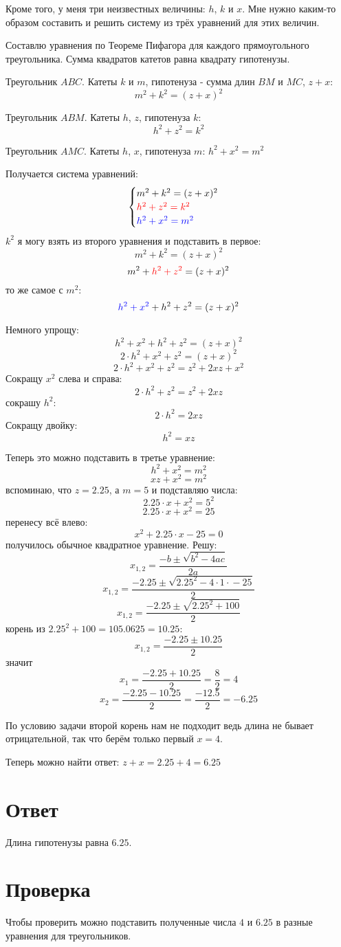 \documentclass{article}
\begin{document}
Кроме того, у меня три неизвестных величины:  $h$, $k$ и $x$. Мне нужно каким-то образом составить и решить систему из трёх уравнений для этих величин.

Составлю уравнения по Теореме Пифагора для каждого прямоугольного треугольника. Сумма квадратов катетов равна квадрату гипотенузы.

Треугольник $ABC$. Катеты $k$ и $m$, гипотенуза - сумма длин $BM$ и $MC$, $z+x$:
$$m^2+k^2=(z+x)^2$$

Треугольник $ABM$. Катеты $h$, $z$, гипотенуза $k$:
$$h^2+z^2=k^2$$

Треугольник $AMC$. Катеты $h$, $x$, гипотенуза $m$:
$h^2+x^2=m^2$

Получается система уравнений:
$$
\begin{cases}
m^2+k^2=(z+x)^2 \\
{\color{red}h^2+z^2=k^2} \\
{\color{blue}h^2+x^2=m^2}
\end{cases}
$$
$k^2$ я могу взять из второго уравнения и подставить в первое:
$$m^2+k^2=(z+x)^2$$
$$m^2+{\color{red}h^2+z^2}=(z+x)^2$$
то же самое с $m^2$:
$${\color{blue}h^2+x^2}+h^2+z^2=(z+x)^2$$

Немного упрощу:
$$h^2+x^2+h^2+z^2=(z+x)^2$$
$$2\cdot{}h^2+x^2+z^2=(z+x)^2$$
$$2\cdot{}h^2+x^2+z^2=z^2+2xz+x^2$$
Сокращу $x^2$ слева и справа:
$$2\cdot{}h^2+z^2=z^2+2xz$$
сокрашу $h^2$:
$$2\cdot{}h^2=2xz$$
Сокращу двойку:
$$h^2=xz$$

Теперь это можно подставить в третье уравнение:
$$h^2+x^2=m^2$$
$$xz+x^2=m^2$$
вспоминаю, что $z=2.25$, а $m=5$ и подставляю числа:
$$2.25\cdot{}x+x^2=5^2$$
$$2.25\cdot{}x+x^2=25$$
перенесу всё влево:
$$x^2+2.25\cdot{}x-25=0$$
получилось обычное квадратное уравнение.
Решу:
$$x_{1,2}=\frac{-b\pm\sqrt{b^2-4ac}}{2a}$$
$$x_{1,2}=\frac{-2.25\pm\sqrt{2.25^2-4\cdot{}1\cdot{}-25}}{2}$$
$$x_{1,2}=\frac{-2.25\pm\sqrt{2.25^2+100}}{2}$$
корень из $2.25^2+100=105.0625=10.25$:
$$x_{1,2}=\frac{-2.25\pm10.25}{2}$$
значит 
$$x_1=\frac{-2.25+10.25}{2}=\frac{8}{2}=4$$
$$x_2=\frac{-2.25-10.25}{2}=\frac{-12.5}{2}=-6.25$$

По условию задачи второй корень нам не подходит ведь длина не бывает отрицательной, так что берём только первый $x=4$.

Теперь можно найти ответ: $z+x=2.25+4=6.25$

\section{Ответ}
Длина гипотенузы равна $6.25$.

\section{Проверка}
Чтобы проверить можно подставить полученные числа $4$ и $6.25$  в разные уравнения для треугольников.
\end{document}
